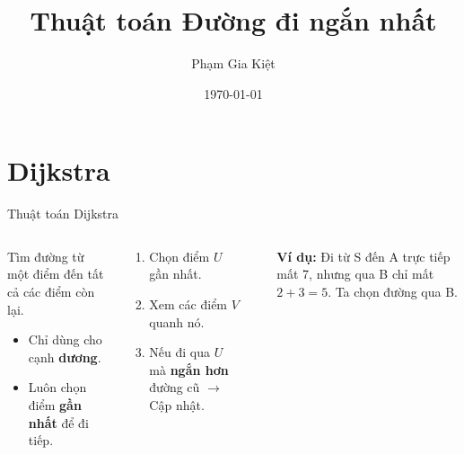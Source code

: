 \documentclass{beamer}
\title{Thuật toán Đường đi ngắn nhất}
\author{Phạm Gia Kiệt}
\date{\today}
\begin{document}
\frame{\titlepage}

\section{Dijkstra}
\begin{frame}{Thuật toán Dijkstra}

\begin{columns}

\begin{tcolorbox}[title=\faWalking \ Ý tưởng]
Tìm đường từ một điểm đến tất cả các điểm còn lại.
\begin{itemize}
    \item[\faCheck] Chỉ dùng cho cạnh \textbf{dương}.
    \item[\faStar] Luôn chọn điểm \textbf{gần nhất} để đi tiếp.
\end{itemize}
\end{tcolorbox}

\vspace{0.2cm}

\begin{tcolorbox}[colframe=main2, title=\faSync \ Quy trình]
\begin{enumerate}
    \item Chọn điểm $U$ gần nhất.
    \item Xem các điểm $V$ quanh nó.
    \item Nếu đi qua $U$ mà \textbf{ngắn hơn} đường cũ $\to$ Cập nhật.
\end{enumerate}
\end{tcolorbox}

\begin{center}
\end{center}

\begin{tcolorbox}
\small \faLightbulb \textbf{Ví dụ:} Đi từ S đến A trực tiếp mất 7, nhưng qua B chỉ mất $2+3=5$. Ta chọn đường qua B.
\end{tcolorbox}

\end{columns}
\end{frame}
\end{document}
